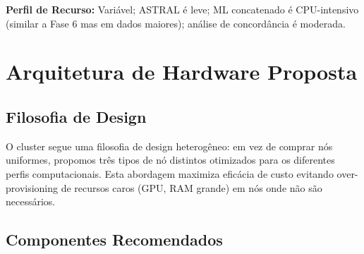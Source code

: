 \textbf{Perfil de Recurso:} Variável; ASTRAL é leve; ML concatenado é CPU-intensivo (similar a Fase 6 mas em dados maiores); análise de concordância é moderada.

\section{Arquitetura de Hardware Proposta}

\subsection{Filosofia de Design}

O cluster segue uma filosofia de design heterogêneo: em vez de comprar nós uniformes, propomos três tipos de nó distintos otimizados para os diferentes perfis computacionais. Esta abordagem maximiza eficácia de custo evitando over-provisioning de recursos caros (GPU, RAM grande) em nós onde não são necessários.

\subsection{Componentes Recomendados}

\begin{table}[htbp]
\centering
\caption{Componentes Recomendados de Hardware para Cluster Filogenômico}
\end{table}

